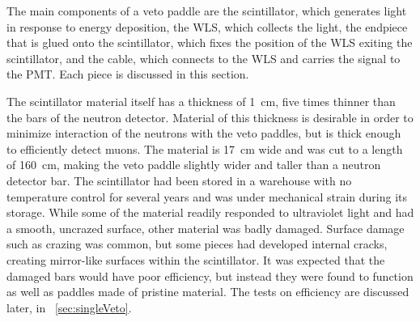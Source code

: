The main components of a veto paddle are the scintillator, which generates light in response to energy deposition, the WLS, which collects the light, the endpiece that is glued onto the scintillator, which fixes the position of the WLS exiting the scintillator, and the cable, which connects to the WLS and carries the signal to the PMT.  Each piece is discussed in this section.

The scintillator material itself has a thickness of 1~cm, five times thinner than the bars of the neutron detector.  Material of this thickness is desirable in order to minimize interaction of the neutrons with the veto paddles, but is thick enough to efficiently detect muons.  The material is 17~cm wide and was cut to a length of 160~cm, making the veto paddle slightly wider and taller than a neutron detector bar.  The scintillator had been stored in a warehouse with no temperature control for several years and was under mechanical strain during its storage.  While some of the material readily responded to ultraviolet light and had a smooth, uncrazed surface, other material was badly damaged.  Surface damage such as crazing was common, but some pieces had developed internal cracks, creating mirror-like surfaces within the scintillator.  It was expected that the damaged bars would have poor efficiency, but instead they were found to function as well as paddles made of pristine material.  The tests on efficiency are discussed later, in {\sect}~\ref{sec:singleVeto}.


